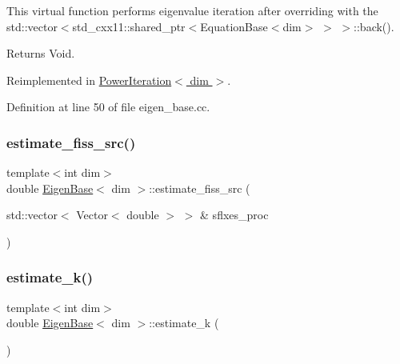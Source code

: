 This virtual function performs eigenvalue iteration after overriding with the std\+::vector$<$std\+\_\+cxx11\+::shared\+\_\+ptr$<$Equation\+Base$<$dim$>$ $>$ $>$\+::back().

\begin{DoxyReturn}{Returns}
Void. 
\end{DoxyReturn}


Reimplemented in \hyperlink{class_power_iteration_a583586002126f8b7a523e95327047cba}{Power\+Iteration$<$ dim $>$}.



Definition at line 50 of file eigen\+\_\+base.\+cc.

\mbox{\label{class_eigen_base_ae733df97cbb04ca2e8a2568acdf9f222}} 
\subsubsection{\texorpdfstring{estimate\+\_\+fiss\+\_\+src()}{estimate\_fiss\_src()}}
{\footnotesize\ttfamily template$<$int dim$>$ \\
double \hyperlink{class_eigen_base}{Eigen\+Base}$<$ dim $>$\+::estimate\+\_\+fiss\+\_\+src (\begin{DoxyParamCaption}\item[{std\+::vector$<$ Vector$<$ double $>$ $>$ \&}]{sflxes\+\_\+proc }\end{DoxyParamCaption})\hspace{0.3cm}{\ttfamily [protected]}}

\mbox{\label{class_eigen_base_a1ad5ce67d3534960731d34691db2f4d9}} 
\subsubsection{\texorpdfstring{estimate\+\_\+k()}{estimate\_k()}}
{\footnotesize\ttfamily template$<$int dim$>$ \\
double \hyperlink{class_eigen_base}{Eigen\+Base}$<$ dim $>$\+::estimate\+\_\+k (\begin{DoxyParamCaption}{ }\end{DoxyParamCaption})\hspace{0.3cm}{\ttfamily [protected]}}



